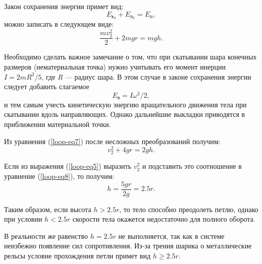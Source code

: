 \documentclass[All.tex]{subfiles}
\begin{document}
Закон сохранения энергии примет вид:
\begin{equation}\label{loop-eq6}
E_{\text{к}_{2}} + E_{\text{п}_{2}} = E_{\text{п}},
\end{equation}
можно записать в следующем виде:
\begin{equation}\label{loop-eq7}
\frac{mv_{2}^{2}}{2} + 2mgr = mgh.
\end{equation}

Необходимо сделать важное замечание о том, что при скатывании шара конечных размеров (нематериальная точка) нужно учитывать его момент инерции $I = 2mR^2/5$, где \textit{R} — радиус шара.
В этом случае в законе сохранения энергии следует добавить слагаемое $$E_\text{в} = I\omega^{2}/2,$$
и тем самым учесть кинетическую энергию вращательного движения тела при скатывании вдоль направляющих.
Однако дальнейшие выкладки приводятся в приближении материальной точки.

Из уравнения (\ref{loop-eq7}) после несложных преобразований получим:
\begin{equation}\label{loop-eq8}
v_{2}^{2} + 4gr = 2gh.
\end{equation}

Если из выражения (\ref{loop-eq5}) выразить $ v_{2}^{2} $ и подставить это соотношение в уравнение (\ref{loop-eq8}), то получим:
\begin{equation}\label{loop-eq9}
h = \frac{5gr}{2g} = 2.5r.
\end{equation}

Таким образом, если высота $ h > 2.5r $, то тело способно преодолеть петлю, однако при условии $ h < 2.5r $ скорости тела окажется недостаточно для полного оборота.

В реальности же равенство $ h = 2.5r $ не выполняется, так как в системе неизбежно появление сил сопротивления.
Из-за трения шарика о металлические рельсы условие прохождения петли примет вид $ h \geq 2.5r $.
\end{document}
